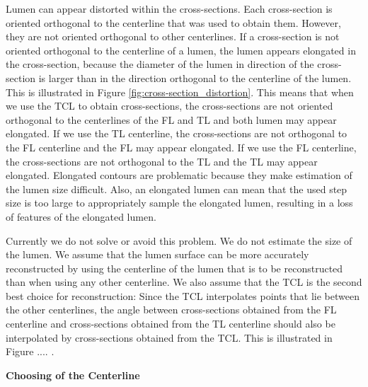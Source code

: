 \documentclass[thesis.tex]{subfiles}
\begin{document}
Lumen can appear distorted within the cross-sections. Each cross-section is oriented orthogonal to the centerline that was used to obtain them. However, they are not oriented orthogonal to other centerlines. If a cross-section is not oriented orthogonal to the centerline of a lumen, the lumen appears elongated in the cross-section, because the diameter of the lumen in direction of the cross-section is larger than in the direction orthogonal to the centerline of the lumen. This is illustrated in Figure \ref{fig:cross-section_distortion}. This means that when we use the TCL to obtain cross-sections, the cross-sections are not oriented orthogonal to the centerlines of the FL and TL and both lumen may appear elongated. If we use the TL centerline, the cross-sections are not orthogonal to the FL centerline and the FL may appear elongated. If we use the FL centerline, the cross-sections are not orthogonal to the TL and the TL may appear elongated. Elongated contours are problematic because they make estimation of the lumen size difficult. Also, an elongated lumen can mean that the used step size is too large to appropriately sample the elongated lumen, resulting in a loss of features of the elongated lumen.

Currently we do not solve or avoid this problem. We do not estimate the size of the lumen. We assume that the lumen surface can be more accurately reconstructed by using the centerline of the lumen that is to be reconstructed than when using any other centerline. We also assume that the TCL is the second best choice for reconstruction: Since the TCL interpolates points that lie between the other centerlines, the angle between cross-sections obtained from the FL centerline and cross-sections obtained from the TL centerline should also be interpolated by cross-sections obtained from the TCL. This is illustrated in Figure .... .

\textbf{Choosing of the Centerline}
\end{document}
